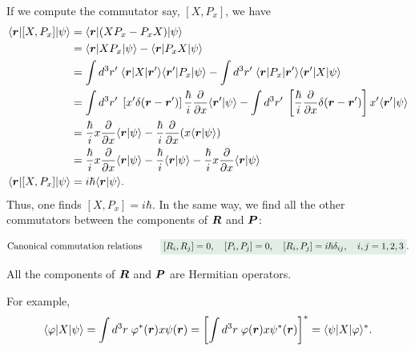 If we compute the commutator say, $[X,P_x]$, we have
\begin{align*}
    \langle\bm{r}|[X,P_x]|\psi\rangle&=\langle\bm{r}|(XP_x-P_xX)|\psi\rangle\\
    &=\langle\bm{r}|XP_x|\psi\rangle-\langle\bm{r}|P_xX|\psi\rangle\\
    &=\int d^3r'\;\langle\bm{r}|X|\bm{r}'\rangle\langle\bm{r}'|P_x|\psi\rangle-\int d^3r'\;\langle\bm{r}|P_x|\bm{r}'\rangle\langle\bm{r}'|X|\psi\rangle\\
    &=\int d^3r'\;\left[x'\delta(\bm{r}-\bm{r}')\right]\frac{\hbar}{i}\frac{\partial}{\partial x}\langle\bm{r}'|\psi\rangle-\int d^3r'\;\left[\frac{\hbar}{i}\frac{\partial}{\partial x}\delta(\bm{r}-\bm{r}')\right]x'\langle\bm{r}'|\psi\rangle\\
    &=\frac{\hbar}{i}x\frac{\partial}{\partial x}\langle\bm{r}|\psi\rangle-\frac{\hbar}{i}\frac{\partial}{\partial x}(x\langle\bm{r}|\psi\rangle)\\
    &=\frac{\hbar}{i}x\frac{\partial}{\partial x}\langle\bm{r}|\psi\rangle-\frac{\hbar}{i}\langle\bm{r}|\psi\rangle-\frac{\hbar}{i}x\frac{\partial}{\partial x}\langle\bm{r}|\psi\rangle\\
    \langle\bm{r}|[X,P_x]|\psi\rangle&=i\hbar\langle\bm{r}|\psi\rangle.
\end{align*}
Thus, one finds $[X,P_x]=i\hbar$. In the same way, we find all the other commutators between the components of $\bm{R}$ and $\bm{P}$:

\begin{align}
    \text{Canonical commutation relations}\qquad\highlight{[R_i,R_j]=0,\quad[P_i,P_j]=0,\quad[R_i,P_j]=i\hbar\delta_{ij},\quad i,j=1,2,3}.
\end{align}


\begin{emphasizer}
    All the components of $\bm{R}$ and $\bm{P}$ are Hermitian operators.
\end{emphasizer}
For example,
\begin{align*}
    \langle\varphi|X|\psi\rangle=\int d^3r\;\varphi^*(\bm{r})x\psi(\bm{r})=\left[\int d^3r\;\varphi(\bm{r})x\psi^*(\bm{r})\right]^*=\langle\psi|X|\varphi\rangle^*.
\end{align*}
%
